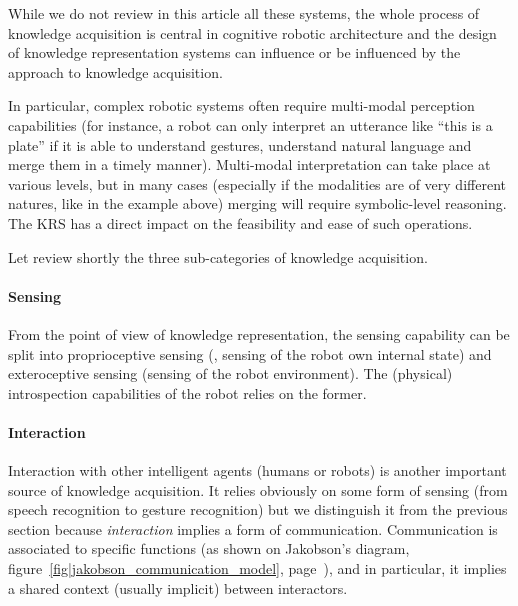 While we do not review in this article all these systems, the whole process of
knowledge acquisition is central in cognitive robotic architecture and the
design of knowledge representation systems can influence or be influenced by
the approach to knowledge acquisition.

In particular, complex robotic systems often require multi-modal perception
capabilities (for instance, a robot can only interpret an utterance like ``this
is a plate'' if it is able to understand gestures, understand natural language
and merge them in a timely manner). Multi-modal interpretation can take place
at various levels, but in many cases (especially if the modalities are of very
different natures, like in the example above) merging will require
symbolic-level reasoning. The KRS has a direct impact on the feasibility and
ease of such operations.

Let review shortly the three sub-categories of knowledge acquisition.

\begin{scriptsize}
\begin{center}
\end{center}
\end{scriptsize}

\paragraph{Sensing}

From the point of view of knowledge representation, the sensing capability can
be split into proprioceptive sensing (\ie, sensing of the robot own internal
state) and exteroceptive sensing (sensing of the robot environment). The
(physical) introspection capabilities of the robot relies on the former.


\paragraph{Interaction}

Interaction with other intelligent agents (humans or robots) is another
important source of knowledge acquisition. It relies obviously on some form of
sensing (from speech recognition to gesture recognition) but we distinguish it
from the previous section because \emph{interaction} implies a form of
communication. Communication is associated to specific functions
(as shown on Jakobson's diagram, figure~\ref{fig|jakobson_communication_model},
page~\pageref{fig|jakobson_communication_model}), and in particular, it implies
a shared context (usually implicit) between interactors.


